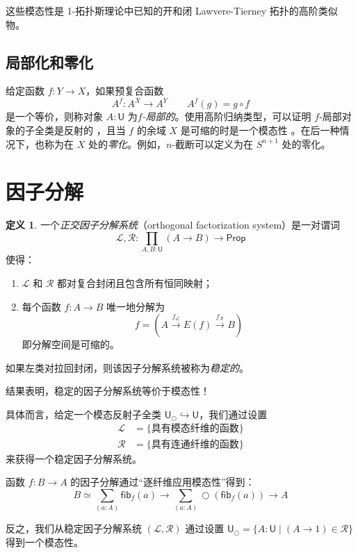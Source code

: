 \documentclass[UTF8]{ctexart}
\theoremstyle{definition}
\newtheorem{definition}{定义}[section]
\newcommand{\U}{\mathsf{U}}
\newcommand{\Prop}{\mathsf{Prop}}
\newcommand{\modal}{\bigcirc}
\begin{document}
这些模态性是 1-拓扑斯理论中已知的开和闭 Lawvere-Tierney 拓扑的高阶类似物。

\subsection{局部化和零化}

给定函数 $f : Y \to X$，如果预复合函数
\[
A^f : A^X \to A^Y \qquad A^f(g) = g \circ f
\]
是一个等价，则称对象 $A:\U$ 为\emph{$f$-局部的}。使用高阶归纳类型，可以证明 $f$-局部对象的子全类是反射的 \cite[定理 2.16]{RSS20}，且当 $f$ 的余域 $X$ 是可缩的时是一个模态性 \cite[定理 2.17]{RSS20}。在后一种情况下，也称为在 $X$ 处的\emph{零化}。例如，$n$-截断可以定义为在 $S^{n+1}$ 处的零化。

\section{因子分解}

\begin{definition}
一个\emph{正交因子分解系统}（orthogonal factorization system）是一对谓词
\[
\mathcal{L}, \mathcal{R} : \prod_{A,B:\U} (A \to B) \to \Prop
\]
使得：
\begin{enumerate}
    \item $\mathcal{L}$ 和 $\mathcal{R}$ 都对复合封闭且包含所有恒同映射；
    \item 每个函数 $f : A \to B$ 唯一地分解为
    \[
    f = (A \xrightarrow{f_{\mathcal{L}}} E(f) \xrightarrow{f_{\mathcal{R}}} B)
    \]
    即分解空间是可缩的。
\end{enumerate}
如果左类对拉回封闭，则该因子分解系统被称为\emph{稳定的}。
\end{definition}

结果表明，稳定的因子分解系统等价于模态性！

具体而言，给定一个模态反射子全类 $\U_{\modal} \hookrightarrow \U$，我们通过设置
\begin{align*}
\mathcal{L} &= \{\text{具有模态纤维的函数}\} \\
\mathcal{R} &= \{\text{具有连通纤维的函数}\}
\end{align*}
来获得一个稳定因子分解系统。

函数 $f : B \to A$ 的因子分解通过``逐纤维应用模态性''得到：
\[
B \simeq \sum_{(a:A)} \mathsf{fib}_f(a) \longrightarrow \sum_{(a:A)} \modal(\mathsf{fib}_f(a)) \longrightarrow A
\]

反之，我们从稳定因子分解系统 $(\mathcal{L}, \mathcal{R})$ 通过设置 $\U_{\modal} = \{A:\U \mid (A \to 1) \in \mathcal{R}\}$ 得到一个模态性。
\end{document}

